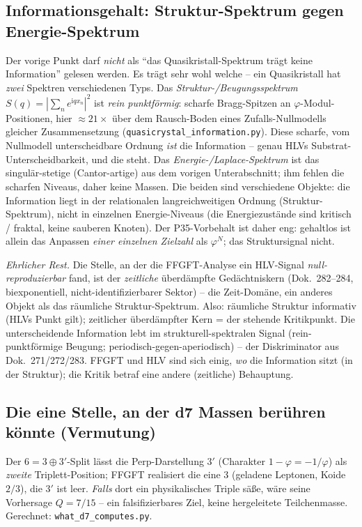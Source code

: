 \subsection{Informationsgehalt: Struktur-Spektrum gegen Energie-Spektrum}
Der vorige Punkt darf \emph{nicht} als \enquote{das Quasikristall-Spektrum tr\"agt keine
Information} gelesen werden. Es tr\"agt sehr wohl welche -- ein Quasikristall hat \emph{zwei}
Spektren verschiedenen Typs. Das \emph{Struktur-/Beugungsspektrum} $S(q)=|\sum_n e^{\mathrm i q
x_n}|^2$ ist \emph{rein punktf\"ormig}: scharfe Bragg-Spitzen an $\varphi$-Modul-Positionen,
hier $\approx21\times$ \"uber dem Rausch-Boden eines Zufalls-Nullmodells gleicher Zusammensetzung
(\texttt{quasicrystal\_information.py}). Diese scharfe, vom Nullmodell unterscheidbare Ordnung
\emph{ist} die Information -- genau HLVs Substrat-Unterscheidbarkeit, und die steht. Das
\emph{Energie-/Laplace-Spektrum} ist das singul\"ar-stetige (Cantor-artige) aus dem vorigen
Unterabschnitt; ihm fehlen die scharfen Niveaus, daher keine Massen. Die beiden sind
verschiedene Objekte: die Information liegt in der relationalen langreichweitigen Ordnung
(Struktur-Spektrum), nicht in einzelnen Energie-Niveaus (die Energiezust\"ande sind
kritisch / fraktal, keine sauberen Knoten). Der P35-Vorbehalt ist daher eng: gehaltlos ist
allein das Anpassen \emph{einer einzelnen Zielzahl} als $\varphi^N$; das Struktursignal nicht.

\noindent\emph{Ehrlicher Rest.} Die Stelle, an der die FFGFT-Analyse ein HLV-Signal
\emph{null-reproduzierbar} fand, ist der \emph{zeitliche} \"uberd\"ampfte Ged\"achtniskern
(Dok.~282--284, biexponentiell, nicht-identifizierbarer Sektor) -- die Zeit-Domäne, ein anderes
Objekt als das r\"aumliche Struktur-Spektrum. Also: r\"aumliche Struktur informativ (HLVs Punkt
gilt); zeitlicher \"uberd\"ampfter Kern = der stehende Kritikpunkt. Die unterscheidende
Information lebt im strukturell-spektralen Signal (rein-punktf\"ormige Beugung;
periodisch-gegen-aperiodisch) -- der Diskriminator aus Dok.~271/272/283. FFGFT und HLV sind sich
einig, \emph{wo} die Information sitzt (in der Struktur); die Kritik betraf eine andere
(zeitliche) Behauptung.

\subsection{Die eine Stelle, an der d7 Massen ber\"uhren k\"onnte (Vermutung)}
Der $6=3\oplus3'$-Split l\"asst die Perp-Darstellung $3'$ (Charakter $1-\varphi=-1/\varphi$) als
\emph{zweite} Triplett-Position; FFGFT realisiert die eine $3$ (geladene Leptonen, Koide $2/3$),
die $3'$ ist leer. \emph{Falls} dort ein physikalisches Triple s\"a\ss e, w\"are seine
Vorhersage $Q=7/15$ -- ein falsifizierbares Ziel, keine hergeleitete Teilchenmasse. Gerechnet:
\texttt{what\_d7\_computes.py}.

